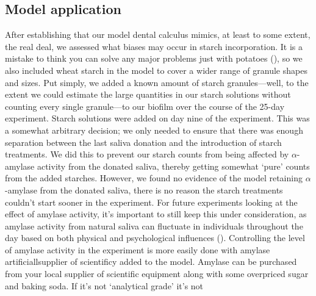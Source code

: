 \documentclass[
  b5paper,
]{book}
\begin{document}
\subsection{Model application}\label{model-application}

After establishing that our model dental calculus mimics, at least to
some extent, the real deal, we assessed what biases may occur in starch
incorporation. It is a mistake to think you can solve any major problems
just with potatoes (),
so we also included wheat starch in the model to cover a wider range of
granule shapes and sizes. Put simply, we added a known amount of starch
granules---well, to the extent we could estimate the large quantities in
our starch solutions without counting every single granule---to our
biofilm over the course of the 25-day experiment. Starch solutions were
added on day nine of the experiment. This was a somewhat arbitrary
decision; we only needed to ensure that there was enough separation
between the last saliva donation and the introduction of starch
treatments. We did this to prevent our starch counts from being affected
by \(\alpha\)-amylase activity from the donated saliva, thereby getting
somewhat `pure' counts from the added starches. However, we found no
evidence of the model retaining \(\alpha\)-amylase from the donated
saliva, there is no reason the starch treatments couldn't start sooner
in the experiment. For future experiments looking at the effect of
amylase activity, it's important to still keep this under consideration,
as amylase activity from natural saliva can fluctuate in individuals
throughout the day based on both physical and psychological influences
(). Controlling
the level of amylase activity in the experiment is more easily done with
amylase artificiallsupplier of scientificy added to the model. Amylase
can be purchased from your local supplier of scientific equipment along
with some overpriced sugar and baking soda. If it's not `analytical
grade' it's not
\end{document}
